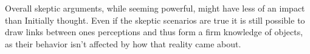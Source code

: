 \documentclass[14pt]{article}
\begin{document}
Overall skeptic arguments, while seeming powerful, might have less of an impact than Initially thought. Even if the skeptic scenarios are true it is still possible
to draw links between ones perceptions and thus form a firm knowledge of objects, as their behavior isn't affected by how that reality came about.

\printbibliography
\end{document}
